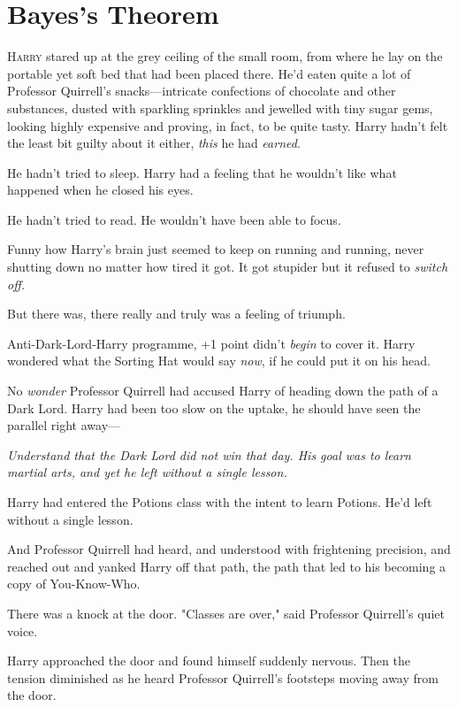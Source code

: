 \chapter{Bayes's Theorem}

\lettrine{H}{arry} stared up at the grey ceiling of the small room, from where he lay on the
portable yet soft bed that had been placed there. He'd eaten quite a lot of
Professor Quirrell's snacks—intricate confections of chocolate and other
substances, dusted with sparkling sprinkles and jewelled with tiny sugar gems,
looking highly expensive and proving, in fact, to be quite tasty. Harry hadn't
felt the least bit guilty about it either, \emph{this} he had \emph{earned}.

He hadn't tried to sleep. Harry had a feeling that he wouldn't like what
happened when he closed his eyes.

He hadn't tried to read. He wouldn't have been able to focus.

Funny how Harry's brain just seemed to keep on running and running, never
shutting down no matter how tired it got. It got stupider but it refused to
\emph{switch off.}

But there was, there really and truly was a feeling of triumph.

Anti-Dark-Lord-Harry programme, +1 point didn't \emph{begin} to cover it. Harry
wondered what the Sorting Hat would say \emph{now}, if he could put it on his
head.

No \emph{wonder} Professor Quirrell had accused Harry of heading down the path
of a Dark Lord. Harry had been too slow on the uptake, he should have seen the
parallel right away—

\emph{Understand that the Dark Lord did not win that day. His goal was to learn
martial arts, and yet he left without a single lesson.}

Harry had entered the Potions class with the intent to learn Potions. He'd left
without a single lesson.

And Professor Quirrell had heard, and understood with frightening precision,
and reached out and yanked Harry off that path, the path that led to his
becoming a copy of You-Know-Who.

There was a knock at the door. "Classes are over," said Professor Quirrell's
quiet voice.

Harry approached the door and found himself suddenly nervous. Then the tension
diminished as he heard Professor Quirrell's footsteps moving away from the door.

